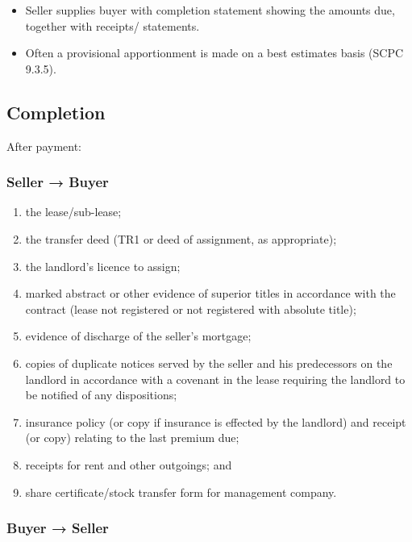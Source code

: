 \documentclass[
]{article}
\providecommand{\tightlist}{%
  \setlength{\itemsep}{0pt}\setlength{\parskip}{0pt}}
\begin{document}
\begin{itemize}
  \begin{itemize}
  \tightlist
  \item
    Seller supplies buyer with completion statement showing the amounts
    due, together with receipts/ statements.
  \item
    Often a provisional apportionment is made on a best estimates basis
    (SCPC 9.3.5).
  \end{itemize}
\end{itemize}

\hypertarget{completion-1}{%
\subsection{Completion}\label{completion-1}}

After payment:

\hypertarget{seller-buyer}{%
\subsubsection{Seller → Buyer}\label{seller-buyer}}

\begin{enumerate}
\tightlist
\item
  the lease/sub-lease;
\item
  the transfer deed (TR1 or deed of assignment, as appropriate);
\item
  the landlord's licence to assign;
\item
  marked abstract or other evidence of superior titles in accordance
  with the contract (lease not registered or not registered with
  absolute title);
\item
  evidence of discharge of the seller's mortgage;
\item
  copies of duplicate notices served by the seller and his predecessors
  on the landlord in accordance with a covenant in the lease requiring
  the landlord to be notified of any dispositions;
\item
  insurance policy (or copy if insurance is effected by the landlord)
  and receipt (or copy) relating to the last premium due;
\item
  receipts for rent and other outgoings; and
\item
  share certificate/stock transfer form for management company.
\end{enumerate}

\hypertarget{buyer-seller}{%
\subsubsection{Buyer → Seller}\label{buyer-seller}}
\end{document}
